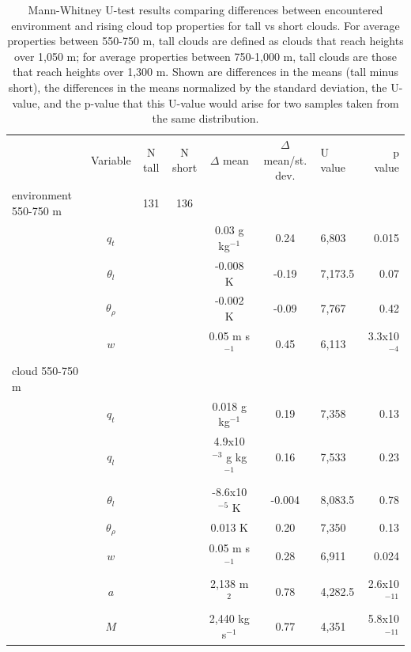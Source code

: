 \documentclass[acp]{copernicus}
\begin{document}




\begin{table}[t]
\label{tbl:mannwhitneyu}
\caption{Mann-Whitney U-test results comparing differences between 
encountered environment and rising cloud top properties for tall vs short 
clouds.  For average properties between 550-750 m, tall clouds are defined as 
clouds that reach heights over 1,050 m; for average properties between 
750-1,000 m, tall clouds are those that reach heights over 1,300 m.  Shown are 
differences in the means (tall minus short), the differences in the means 
normalized by the standard deviation, the U-value, and the p-value that this 
U-value would arise for two samples taken from the same distribution.}
\vskip4mm
\centering
\begin{tabular}{lccccclr}
\tophline
& Variable & N tall & N short & $\Delta$ mean & $\Delta$ mean/st. dev. & U value & p value\\
\middlehline
environment 550-750 m & & 131 & 136 & & & & \\
& $q_t$       & & &  0.03 g kg$^{-1}$          &  0.24 & 6,803   & 0.015    \\ 
& $\theta_l$ & & & -0.008 K                   & -0.19 & 7,173.5 & 0.07    \\
& $\theta_\rho$ & & & -0.002 K               & -0.09 & 7,767   & 0.42    \\
& $w$         & & &  0.05 m s$^{-1}$           &  0.45 & 6,113   & 3.3x10$^{-4}$ \\
cloud 550-750 m & & & & & & \\
& $q_t$       & & &  0.018 g kg$^{-1}$         &  0.19 & 7,358   & 0.13   \\
& $q_l$       & & &  4.9x10$^{-3}$ g kg$^{-1}$ &  0.16 & 7,533   & 0.23   \\
& $\theta_l$ & & & -8.6x10$^{-5}$ K           & -0.004 & 8,083.5 & 0.78 \\
& $\theta_\rho$ & & &  0.013 K               &  0.20 & 7,350   & 0.13  \\
& $w$         & & &  0.05 m s$^{-1}$           &  0.28 & 6,911   & 0.024  \\
& $a$         & & &  2,138 m$^2$                &  0.78 & 4,282.5 & 2.6x10$^{-11}$ \\
& $M$         & & &  2,440 kg s$^{-1}$    &  0.77 & 4,351 & 5.8x10$^{-11}$ \\

\end{tabular}
\end{table}
\end{document}
